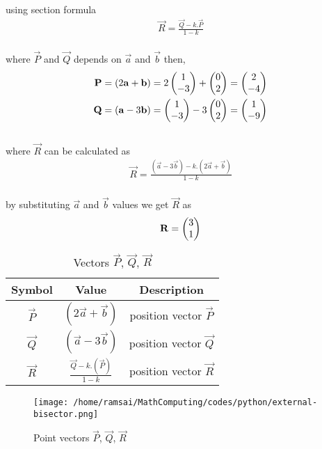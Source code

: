 \documentclass[11pt]{book}
\begin{document}
using section formula
\begin{align}
    \vec{R}=\frac{\vec{Q}-k.\vec{P}}{1-k}
\end{align}\\
where $\vec{P}$ and $\vec{Q}$ depends on $\vec{a}$ and $\vec{b}$ then,
\begin{align}
	\mathbf{P}=(2\mathbf{a}+\mathbf{b})=2\begin{pmatrix}1\\-3\end{pmatrix}+\begin{pmatrix}0\\2\end{pmatrix}=\begin{pmatrix}2\\-4\end{pmatrix}\\
    \mathbf{Q}=(\mathbf{a}-3\mathbf{b})=\begin{pmatrix}1\\-3\end{pmatrix}-3\begin{pmatrix}0\\2\end{pmatrix}=\begin{pmatrix}1\\-9\end{pmatrix}
\end{align}\\
where $\vec{R}$ can be calculated as 
\begin{align}
	\vec{R}=\frac{(\vec{a}-3\vec{b})-k.(2\vec{a}+\vec{b})}{1-k}
\end{align}\\
by substituting $\vec{a}$ and $\vec{b}$ values we get $\vec{R}$ as
\begin{align}
    \mathbf{R}=\begin{pmatrix}3\\1\end{pmatrix}
\end{align}
\centering
\begin{table}[H]
    \begin{center}
         \begin{tabular}{|c|c|c|}
        \hline
        \textbf{Symbol} & \textbf{Value} & \textbf{Description}\\
        \hline
	    $\vec{P}$ & $(2\vec{a}+\vec{b})$ & position vector $\vec{P}$ \\
        \hline
	    $\vec{Q}$ & $(\vec{a}-3\vec{b})$ & position vector $\vec{Q}$\\
        \hline
	    $\vec{R}$ & $\frac{\vec{Q}-k.(\vec{P})}{1-k}$ & position vector $\vec{R}$\\
        \hline
    \end{tabular}
    \end{center}
    \captionsetup{justification=centering} %
    \caption{Vectors $\vec{P}$, $\vec{Q}$, $\vec{R}$}
    \label{tab:mytable2}   
\end{table}

\begin{figure}[!ht]
    \centering
    \texttt{[image: /home/ramsai/MathComputing/codes/python/external-bisector.png]}
    \captionsetup{justification=centering} %
    \caption{Point vectors $\vec{P}$, $\vec{Q}$, $\vec{R}$}
    \label{fig:enter-label}
\end{figure}
\end{document}
